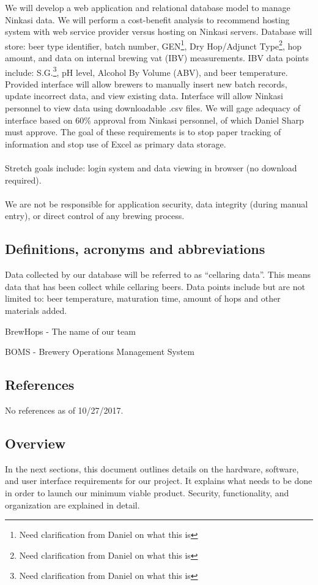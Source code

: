 \documentclass[draftclsnofoot,onecolumn,letterpaper,10pt,compsoc]{IEEEtran}
\begin{document}
	We will develop a web application and relational database model to manage Ninkasi data. We will perform a cost-benefit analysis to recommend hosting system with web service provider versus hosting on Ninkasi servers. Database will store: beer type identifier, batch number, GEN\footnote{Need clarification from Daniel on what this is}, Dry Hop/Adjunct Type\footnote{Need clarification from Daniel on what this is}, hop amount, and data on internal brewing vat (IBV) measurements. IBV data points include: S.G.\footnote{Need clarification from Daniel on what this is}, pH level, Alcohol By Volume (ABV), and beer temperature. Provided interface will allow brewers to manually insert new batch records, update incorrect data, and view existing data. Interface will allow Ninkasi personnel to view data using downloadable .csv files. We will gage adequacy of interface based on 60\% approval from Ninkasi personnel, of which Daniel Sharp must approve. The goal of these requirements is to stop paper tracking of information and stop use of Excel as primary data storage.
	\\
	\\
	Stretch goals include: login system and data viewing in browser (no download required).
	\\
	\\
	We are not be responsible for application security, data integrity (during manual entry), or direct control of any brewing process.


	\subsection{Definitions, acronyms and abbreviations}
	Data collected by our database will be referred to as “cellaring data”. This means data that has been collect while cellaring beers. Data points include but are not limited to: beer temperature, maturation time, amount of hops and other materials added.

	BrewHops - The name of our team

	BOMS - Brewery Operations Management System


	\subsection{References}
    No references as of 10/27/2017.
	\subsection{Overview}
    In the next sections, this document outlines details on the hardware, software, and user interface requirements for our project. It explains what needs to be done in order to launch our minimum viable product. Security, functionality, and organization are explained in detail.
\end{document}
